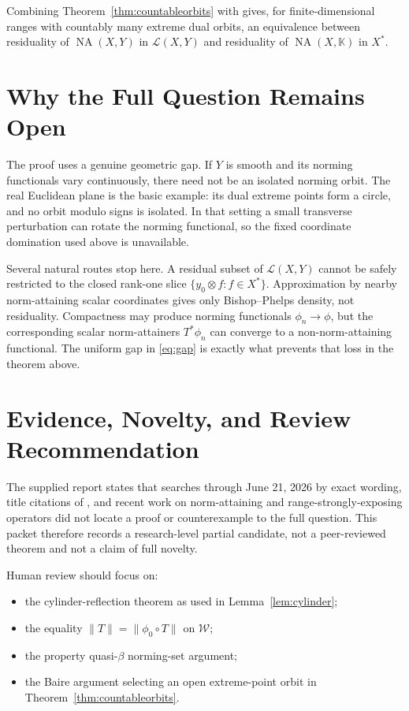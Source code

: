 \documentclass[11pt]{article}
\newcommand{\K}{\mathbb K}
\newcommand{\NA}{\operatorname{NA}}
\newcommand{\calL}{\mathcal L}
\newcommand{\norm}[1]{\lVert #1\rVert}
\begin{document}
Combining Theorem~\ref{thm:countableorbits} with
\cite[Example 3.18(a)]{JMRZ} gives, for finite-dimensional ranges with
countably many extreme dual orbits, an equivalence between residuality of
\(\NA(X,Y)\) in \(\calL(X,Y)\) and residuality of \(\NA(X,\K)\) in \(X^*\).

\section*{Why the Full Question Remains Open}

The proof uses a genuine geometric gap.  If \(Y\) is smooth and its norming
functionals vary continuously, there need not be an isolated norming orbit.
The real Euclidean plane is the basic example: its dual extreme points form a
circle, and no orbit modulo signs is isolated.  In that setting a small
transverse perturbation can rotate the norming functional, so the fixed
coordinate domination used above is unavailable.

Several natural routes stop here.  A residual subset of \(\calL(X,Y)\) cannot
be safely restricted to the closed rank-one slice
\(\{y_0\otimes f:f\in X^*\}\).  Approximation by nearby norm-attaining scalar
coordinates gives only Bishop--Phelps density, not residuality.  Compactness
may produce norming functionals \(\phi_n\to\phi\), but the corresponding
scalar norm-attainers \(T^*\phi_n\) can converge to a non-norm-attaining
functional.  The uniform gap in \eqref{eq:gap} is exactly what prevents that
loss in the theorem above.

\section*{Evidence, Novelty, and Review Recommendation}

The supplied report states that searches through June 21, 2026 by exact
wording, title citations of \cite{JMRZ}, and recent work on norm-attaining and
range-strongly-exposing operators did not locate a proof or counterexample to
the full question.  This packet therefore records a research-level partial
candidate, not a peer-reviewed theorem and not a claim of full novelty.

Human review should focus on:
\begin{itemize}[leftmargin=2em]
\item the cylinder-reflection theorem as used in Lemma~\ref{lem:cylinder};
\item the equality \(\norm T=\norm{\phi_0\circ T}\) on \(\mathcal W\);
\item the property quasi-\(\beta\) norming-set argument;
\item the Baire argument selecting an open extreme-point orbit in
  Theorem~\ref{thm:countableorbits}.
\end{itemize}
\end{document}
